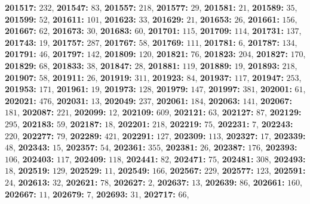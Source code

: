 \textsf{\bfseries 201517:} $232$, \textsf{\bfseries 201547:} $83$, \textsf{\bfseries 201557:} $218$, \textsf{\bfseries 201577:} $29$, \textsf{\bfseries 201581:} $21$, \textsf{\bfseries 201589:} $35$, \textsf{\bfseries 201599:} $52$, \textsf{\bfseries 201611:} $101$, \textsf{\bfseries 201623:} $33$, \textsf{\bfseries 201629:} $21$, \textsf{\bfseries 201653:} $26$, \textsf{\bfseries 201661:} $156$, \textsf{\bfseries 201667:} $62$, \textsf{\bfseries 201673:} $30$, \textsf{\bfseries 201683:} $60$, \textsf{\bfseries 201701:} $115$, \textsf{\bfseries 201709:} $114$, \textsf{\bfseries 201731:} $137$, \textsf{\bfseries 201743:} $19$, \textsf{\bfseries 201757:} $287$, \textsf{\bfseries 201767:} $58$, \textsf{\bfseries 201769:} $111$, \textsf{\bfseries 201781:} $6$, \textsf{\bfseries 201787:} $134$, \textsf{\bfseries 201791:} $46$, \textsf{\bfseries 201797:} $142$, \textsf{\bfseries 201809:} $120$, \textsf{\bfseries 201821:} $76$, \textsf{\bfseries 201823:} $204$, \textsf{\bfseries 201827:} $170$, \textsf{\bfseries 201829:} $68$, \textsf{\bfseries 201833:} $38$, \textsf{\bfseries 201847:} $28$, \textsf{\bfseries 201881:} $119$, \textsf{\bfseries 201889:} $19$, \textsf{\bfseries 201893:} $218$, \textsf{\bfseries 201907:} $58$, \textsf{\bfseries 201911:} $26$, \textsf{\bfseries 201919:} $311$, \textsf{\bfseries 201923:} $84$, \textsf{\bfseries 201937:} $117$, \textsf{\bfseries 201947:} $253$, \textsf{\bfseries 201953:} $171$, \textsf{\bfseries 201961:} $19$, \textsf{\bfseries 201973:} $128$, \textsf{\bfseries 201979:} $147$, \textsf{\bfseries 201997:} $381$, \textsf{\bfseries 202001:} $61$, \textsf{\bfseries 202021:} $476$, \textsf{\bfseries 202031:} $13$, \textsf{\bfseries 202049:} $237$, \textsf{\bfseries 202061:} $184$, \textsf{\bfseries 202063:} $141$, \textsf{\bfseries 202067:} $181$, \textsf{\bfseries 202087:} $221$, \textsf{\bfseries 202099:} $12$, \textsf{\bfseries 202109:} $609$, \textsf{\bfseries 202121:} $63$, \textsf{\bfseries 202127:} $87$, \textsf{\bfseries 202129:} $295$, \textsf{\bfseries 202183:} $59$, \textsf{\bfseries 202187:} $18$, \textsf{\bfseries 202201:} $218$, \textsf{\bfseries 202219:} $75$, \textsf{\bfseries 202231:} $7$, \textsf{\bfseries 202243:} $220$, \textsf{\bfseries 202277:} $79$, \textsf{\bfseries 202289:} $421$, \textsf{\bfseries 202291:} $127$, \textsf{\bfseries 202309:} $113$, \textsf{\bfseries 202327:} $17$, \textsf{\bfseries 202339:} $48$, \textsf{\bfseries 202343:} $15$, \textsf{\bfseries 202357:} $54$, \textsf{\bfseries 202361:} $355$, \textsf{\bfseries 202381:} $26$, \textsf{\bfseries 202387:} $176$, \textsf{\bfseries 202393:} $106$, \textsf{\bfseries 202403:} $117$, \textsf{\bfseries 202409:} $118$, \textsf{\bfseries 202441:} $82$, \textsf{\bfseries 202471:} $75$, \textsf{\bfseries 202481:} $308$, \textsf{\bfseries 202493:} $18$, \textsf{\bfseries 202519:} $129$, \textsf{\bfseries 202529:} $11$, \textsf{\bfseries 202549:} $166$, \textsf{\bfseries 202567:} $229$, \textsf{\bfseries 202577:} $123$, \textsf{\bfseries 202591:} $24$, \textsf{\bfseries 202613:} $32$, \textsf{\bfseries 202621:} $78$, \textsf{\bfseries 202627:} $2$, \textsf{\bfseries 202637:} $13$, \textsf{\bfseries 202639:} $86$, \textsf{\bfseries 202661:} $160$, \textsf{\bfseries 202667:} $11$, \textsf{\bfseries 202679:} $7$, \textsf{\bfseries 202693:} $31$, \textsf{\bfseries 202717:} $66$, 
